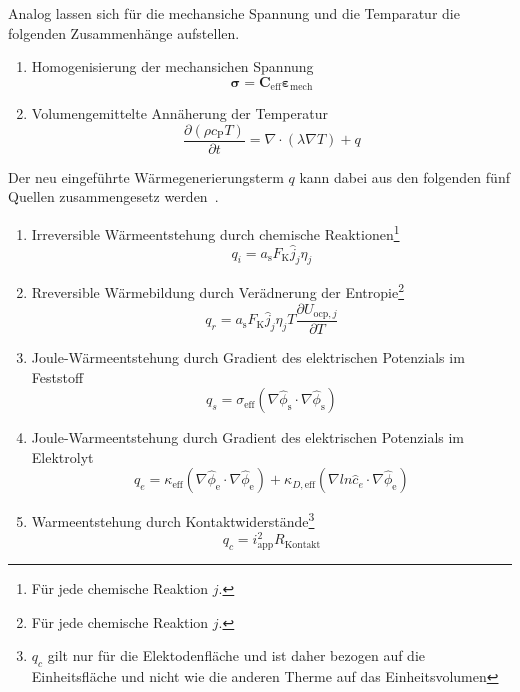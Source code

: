 Analog lassen sich für die mechansiche Spannung und die Temparatur die folgenden Zusammenhänge aufstellen.
\begin{enumerate}
    \item Homogenisierung der mechansichen Spannung
    \begin{equation}
    \boldsymbol{\sigma} = \boldsymbol{C}_{\text{eff}} \boldsymbol{\varepsilon}_{\text{mech}} 
    \end{equation}
    \item Volumengemittelte Annäherung der Temperatur
    \begin{equation}
        \frac{\partial (\rho c_{\text{P}} T)}{\partial t} = \nabla \cdot (\lambda \nabla T) + q
    \end{equation}
\end{enumerate}
Der neu eingeführte Wärmegenerierungsterm $q$ kann dabei aus den folgenden fünf Quellen zusammengesetz werden~\cite{Plett2015}.
\begin{enumerate}
    \item Irreversible Wärmeentstehung durch chemische Reaktionen\footnote{Für jede chemische Reaktion $j$.}
    \begin{equation}
        q_i = a_{\text{s}} F_{\text{K}} \hat{j}_j \eta_{j}
    \end{equation}
    \item Rreversible Wärmebildung durch Verädnerung der Entropie\footnote{Für jede chemische Reaktion $j$.}
    \begin{equation}
    q_{r} = a_{\text{s}} F_{\text{K}} \hat{j}_j \eta_{j} T \frac{\partial U_{\text{ocp},j}}{\partial T}
    \end{equation}
    \item Joule-Wärmeentstehung durch Gradient des elektrischen Potenzials im Feststoff
    \begin{equation}
    q_{s} = \sigma_{\text{eff}}(\nabla\hat{\phi}_{\text{s}} \cdot \nabla\hat{\phi}_{\text{s}})
    \end{equation}
    \item Joule-Warmeentstehung durch Gradient des elektrischen Potenzials im Elektrolyt
    \begin{equation}
        q_{e} = \kappa_{\text{eff}}(\nabla\hat{\phi}_{\text{e}} \cdot \nabla\hat{\phi}_{\text{e}}) + \kappa_{D,\text{eff}} (\nabla ln \hat{c}_e \cdot \nabla \hat{\phi}_{\text{e}})
    \end{equation}
    \item Warmeentstehung durch Kontaktwiderstände\footnote{$q_c$ gilt nur für die Elektodenfläche und ist daher bezogen auf die Einheitsfläche und nicht wie die anderen Therme auf das Einheitsvolumen}
    \begin{equation}
        q_{c} = i_{\text{app}}^2 R_{\text{Kontakt}}
    \end{equation}
\end{enumerate}

